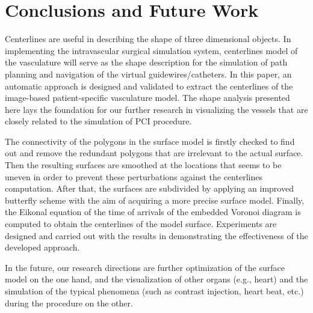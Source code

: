 
\section{Conclusions and Future Work}
\label{sec5_5}

Centerlines are useful in describing the shape of three dimensional objects.
In implementing the intravascular surgical simulation system, centerlines model of the vasculature will serve as the shape description for the simulation of path planning and navigation of the virtual guidewires/catheters.
In this paper, an automatic approach is designed and validated to extract the centerlines of the image-based patient-specific vasculature model.
The shape analysis presented here lays the foundation for our further research in visualizing the vessels that are closely related to the simulation of PCI procedure.

The connectivity of the polygons in the surface model is firstly checked to find out and remove the redundant polygons that are irrelevant to the actual surface.
Then the resulting surfaces are smoothed at the locations that seems to be uneven in order to prevent these perturbations against the centerlines computation.
After that, the surfaces are subdivided by applying an improved butterfly scheme with the aim of acquiring a more precise surface model.
Finally, the Eikonal equation of the time of arrivals of the embedded Voronoi diagram is computed to obtain the centerlines of the model surface.
Experiments are designed and carried out with the results in demonstrating the effectiveness of the developed approach.

In the future, our research directions are further optimization of the surface model on the one hand, and the visualization of other organs (e.g., heart) and the simulation of the typical phenomena (such as contrast injection, heart beat, etc.) during the procedure on the other. %
